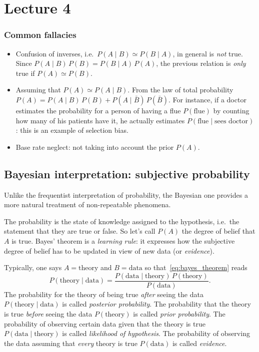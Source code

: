 
\chapter{Lecture 4}

\subsection{Common fallacies}

\begin{itemize}
	\item
		Confusion of inverses, i.e.~$P(A\mid B) \simeq P(B\mid A)$, in general is \emph{not} true.
		Since $P(A\mid B)\,P(B) = P(B\mid A)\,P(A)$, the previous relation is \emph{only} true if $P(A)\simeq P(B)$.
	\item
		Assuming that $P(A)\simeq P(A\mid B)$.
		From the law of total probability $P(A) = P(A\mid B)\,P(B) + P(A\mid \bar B)\,P(\bar B)$.
		For instance, if a doctor estimates the probability for a person of having a flue $P(\text{flue})$ by counting how many of his patients have it, he actually estimates $P(\text{flue}\mid\text{sees doctor})$: this is an example of selection bias.
	\item
		Base rate neglect: not taking into account the prior $P(A)$.
\end{itemize}


\section{Bayesian interpretation: subjective probability}

Unlike the frequentist interpretation of probability, the Bayesian one provides a more natural treatment of non-repeatable phenomena.

The probability is the state of knowledge assigned to the hypothesis, i.e.~the statement that they are true or false.
So let's call $P(A)$ the degree of belief that $A$ is true.
Bayes' theorem is a \emph{learning rule}: it expresses how the subjective degree of belief has to be updated in view of new data (or \emph{evidence}).


Typically, one says $A = \text{theory}$ and $B = \text{data}$ so that~\eqref{eq:bayes_theorem} reads
\begin{equation}
	P(\text{theory}\mid\text{data}) = \frac{P(\text{data}\mid \text{theory})\,P(\text{theory})}{P(\text{data})}.
\end{equation}
The probability for the theory of being true \emph{after} seeing the data $P(\text{theory}\mid\text{data})$ is called \emph{posterior probability}.
The probability that the theory is true \emph{before} seeing the data $P(\text{theory})$ is called \emph{prior probability}.
The probability of observing certain data given that the theory is true $P(\text{data}\mid \text{theory})$ is called \emph{likelihood of hypothesis}.
The probability of observing the data assuming that \emph{every} theory is true $P(\text{data})$ is called \emph{evidence}.



